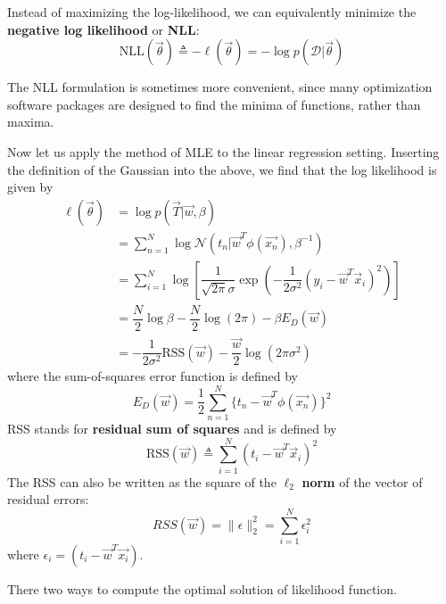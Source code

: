 Instead of maximizing the log-likelihood, we can equivalently minimize the \textbf{negative log likelihood} or \textbf{NLL}:
\begin{equation}
\text{NLL}(\vec{\theta}) \triangleq -\ell(\vec{\theta})=-\log p(\mathcal{D}|\vec{\theta})
\end{equation}

The NLL formulation is sometimes more convenient, since many optimization software packages are designed to find the minima of functions, rather than maxima.

Now let us apply the method of MLE to the linear regression setting. Inserting the definition of the Gaussian into the above, we find that the log likelihood is given by
\begin{align}
\ell(\vec{\theta}) &= \log p(\vec{T}|\vec{w},\beta) \\
&=\sum_{n=1}^{N}\log \mathcal{N}(t_n|\vec{w}^T\phi(\vec{x_n}),\beta^{-1}) \\
&=\sum\limits_{i=1}^N \log\left[\dfrac{1}{\sqrt{2\pi}\sigma}\exp\left(-\dfrac{1}{2\sigma^2}(y_i-\vec{w}^T\vec{x}_i)^2\right)\right] \\
&=\dfrac{N}{2}\log \beta-\dfrac{N}{2}\log (2\pi)-\beta E_D(\vec{w}) \\
&=-\dfrac{1}{2\sigma^2}\text{RSS}(\vec{w})-\dfrac{\vec{w}}{2}\log(2\pi\sigma^2)
\end{align}
where the sum-of-squares error function is defined by
\begin{equation}
E_D(\vec{w}) =
\dfrac{1}{2}\sum_{n=1}^{N}\{t_n-\vec{w}^T\phi(\vec{x_n}) \}^2
\end{equation}
RSS stands for \textbf{residual sum of squares} and is defined by
\begin{equation}
\text{RSS}(\vec{w}) \triangleq \sum\limits_{i=1}^N (t_i-\vec{w}^T\vec{x}_i)^2
\end{equation}
The RSS can also be written as the square of the $\ell_2$ \textbf{norm} of the vector of residual errors:
\begin{equation}
RSS(\vec{w}) = \parallel\epsilon\parallel_2^2 = \sum_{i=1}^{N}\epsilon_i^2
\end{equation}
where $\epsilon_i = (t_i - \vec{w}^T\vec{x_i})$.

There two ways to compute the optimal solution of likelihood function.

